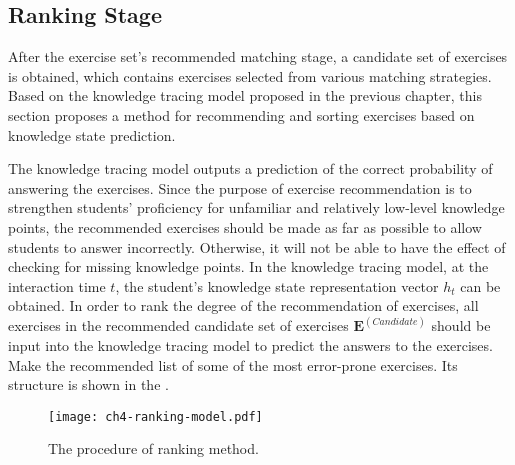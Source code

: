 \subsection{Ranking Stage}


After the exercise set's recommended matching stage, a candidate set of exercises is obtained, which contains exercises selected from various matching strategies. Based on the knowledge tracing model proposed in the previous chapter, this section proposes a method for recommending and sorting exercises based on knowledge state prediction.

The knowledge tracing model outputs a prediction of the correct probability of answering the exercises. Since the purpose of exercise recommendation is to strengthen students' proficiency for unfamiliar and relatively low-level knowledge points, the recommended exercises should be made as far as possible to allow students to answer incorrectly. Otherwise, it will not be able to have the effect of checking for missing knowledge points. In the knowledge tracing model, at the interaction time \(t\), the student's knowledge state representation vector \(h_t\) can be obtained. In order to rank the degree of the recommendation of exercises, all exercises in the recommended candidate set of exercises \(\mathbf{E}^{(Candidate)}\) should be input into the knowledge tracing model to predict the answers to the exercises. Make the recommended list of some of the most error-prone exercises. Its structure is shown in the \figname{\ref{fig:ch4-model-ranking}}.

\begin{figure}[htbp!]
    \centering
    \texttt{[image: ch4-ranking-model.pdf]}
    \caption{The procedure of ranking method.}\label{fig:ch4-model-ranking}
\end{figure}


